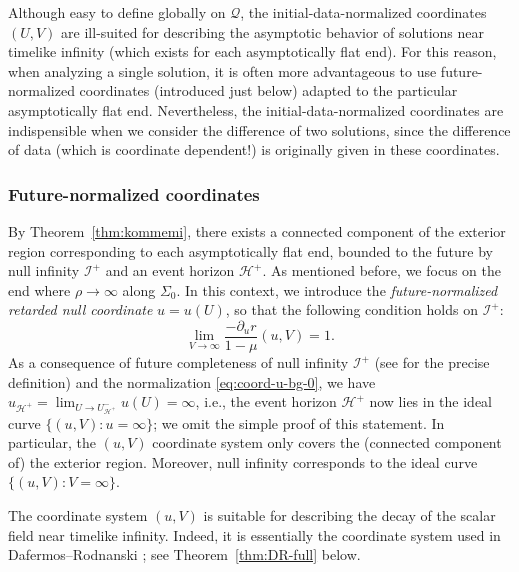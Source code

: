 \documentclass[10pt, reqno]{amsart}
\theoremstyle{definition}
\theoremstyle{remark}
\theoremstyle{conjecture}
\numberwithin{equation}{section}
\newcommand{\set}[1]{\{#1\}}
\newcommand{\rd}{\partial}
\newcommand{\0}{\emptyset}
\newcommand{\Sgm}{\Sigma}
\newcommand{\calH}{\mathcal H}
\newcommand{\calI}{\mathcal I}
\newcommand{\calQ}{\mathcal Q}
\newcommand{\PD}{\calQ}
\newcommand{\EH}{\calH^{+}}
\newcommand{\NI}{\calI^{+}}						%
\begin{document}
Although easy to define globally on $\PD$, the initial-data-normalized coordinates $(U, V)$ are ill-suited for describing the asymptotic behavior of solutions near timelike infinity (which exists for each asymptotically flat end). For this reason, when analyzing a single solution, it is often more advantageous to use future-normalized coordinates (introduced just below) adapted to the particular asymptotically flat end. Nevertheless, the initial-data-normalized coordinates are indispensible when we consider the difference of two solutions, since the difference of data (which is coordinate dependent!) is originally given in these coordinates. 

\subsubsection*{Future-normalized coordinates}
By Theorem~\ref{thm:kommemi}, there exists a connected component of the exterior region  corresponding to each asymptotically flat end, bounded to the future by null infinity $\NI$ and an event horizon $\EH$. As mentioned before, we focus on the end where $\rho \to \infty$ along $\Sgm_{0}$. In this context, we introduce the \emph{future-normalized retarded null coordinate} $u = u(U)$, so that the following condition holds on $\NI$:
\begin{equation}  \label{eq:coord-u-bg-0}
	\lim_{V \to \infty} \frac{-\rd_{u} r}{1-\mu}(u, V) = 1. 
\end{equation}
As a consequence of future completeness of null infinity $\NI$ (see \cite[\S~5.4]{DafTrapped} for the precise definition) and the normalization \eqref{eq:coord-u-bg-0}, we have $u_{\EH} = \lim_{U \to U_{\EH}^{-}} u(U) = \infty$, i.e., the event horizon $\EH$ now lies in the ideal curve $\set{(u, V) : u = \infty}$; we omit the simple proof of this statement. In particular, the $(u,V)$ coordinate system only covers the (connected component of) the exterior region. Moreover, null infinity corresponds to the ideal curve $\set{(u, V) : V = \infty}$.

The coordinate system $(u, V)$ is suitable for describing the decay of the scalar field near timelike infinity. Indeed, it is essentially the coordinate system used in Dafermos--Rodnanski \cite{DRPL}; see Theorem~\ref{thm:DR-full} below.
\end{document}
